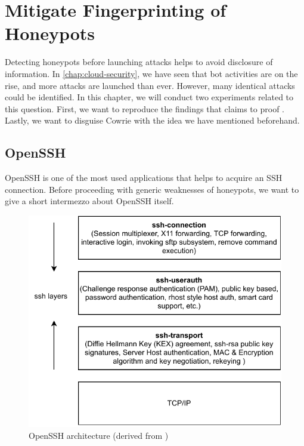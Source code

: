 \chapter{Mitigate Fingerprinting of Honeypots}
\label{chap:fingerprinting}

Detecting honeypots before launching attacks helps to avoid disclosure of information.
In \autoref{chap:cloud-security}, we have seen that bot activities are on the rise, and more attacks are launched than ever.
However, many identical attacks could be identified.
In this chapter, we will conduct two experiments related to this question.
First, we want to reproduce the findings that \citet{vetterl2020} claims to proof .
Lastly, we want to disguise Cowrie with the idea we have mentioned beforehand.

\section{OpenSSH}
\label{sec:openssh}

OpenSSH is one of the most used applications that helps to acquire an SSH connection.
Before proceeding with generic weaknesses of honeypots, we want to give a short intermezzo about OpenSSH itself.

\begin{figure}
    \centering
    \includegraphics{figures/openssh-architecture.pdf}
    \caption[OpenSSH architecture]{OpenSSH architecture (derived from \cite{openssh2007})}
    \label{fig:openssh-architecture}
\end{figure}


